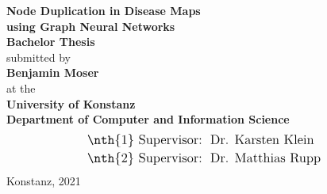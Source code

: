 \documentclass[
	fontsize=10pt, %
	twoside=false, %
	secnumdepth=1, %
  toc=indentunnumbered %
]{kaobook}
\begin{document}
\begin{titlepage}
  \begin{center}
    {\LARGE \textbf{Node Duplication in Disease Maps \\[0.7em] using Graph Neural Networks}}
    \\[2em]
    {\Large \textbf{Bachelor Thesis}}
    \\[5.5em]
    {\Large submitted by}
    \\[1.5em]
    {\LARGE \textbf{Benjamin Moser}}
    \\[1.5em]
    {\Large at the}
    \\[1.2em]
    {\Large \textbf{University of Konstanz}}
    \\[1.0em]
    {\Large \textbf{Department of Computer and Information Science}}
    \\[4em]
    \begin{align*}
      \text{\large {\nth{1} Supervisor}:~} &  \text{ \large Dr. Karsten Klein } \\
      \text{\large {\nth{2} Supervisor}:~} &  \text{ \large Dr. Matthias Rupp } \\
    \end{align*}
    \vfill
    {\Large {Konstanz, 2021}}
  \end{center}
\end{titlepage}











\frontmatter %


\end{document}
